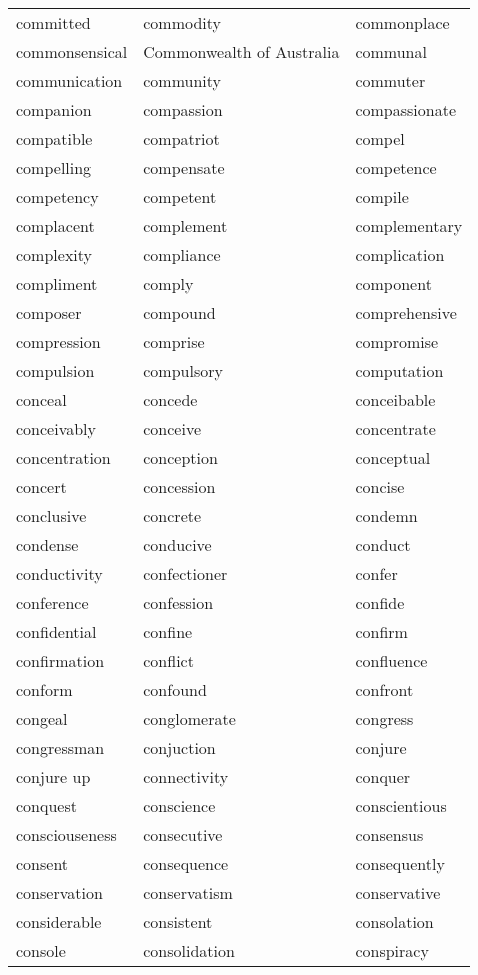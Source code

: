 \documentclass{minimal}
\begin{document}
\begin{longtable}{p{2.7cm}@{\hskip 0.2cm}p{2.7cm}@{\hskip 0.2cm}p{2.7cm}}
committed & commodity & commonplace \\
commonsensical & Commonwealth of Australia & communal \\
communication & community & commuter \\
companion & compassion & compassionate \\
compatible & compatriot & compel \\
compelling & compensate & competence \\
competency & competent & compile \\
complacent & complement & complementary \\
complexity & compliance & complication \\
compliment & comply & component \\
composer & compound & comprehensive \\
compression & comprise & compromise \\
compulsion & compulsory & computation \\
conceal & concede & conceibable \\
conceivably & conceive & concentrate \\
concentration & conception & conceptual \\
concert & concession & concise \\
conclusive & concrete & condemn \\
condense & conducive & conduct \\
conductivity & confectioner & confer \\
conference & confession & confide \\
confidential & confine & confirm \\
confirmation & conflict & confluence \\
conform & confound & confront \\
congeal & conglomerate & congress \\
congressman & conjuction & conjure \\
conjure up & connectivity & conquer \\
conquest & conscience & conscientious \\
consciouseness & consecutive & consensus \\
consent & consequence & consequently \\
conservation & conservatism & conservative \\
considerable & consistent & consolation \\
console & consolidation & conspiracy \\

\end{longtable}
\end{document}
